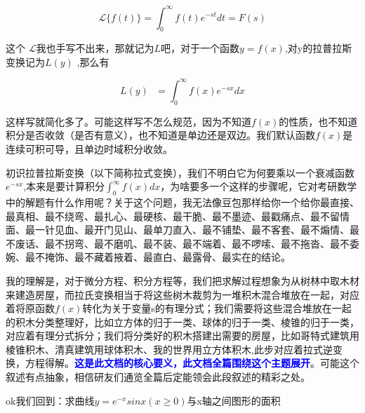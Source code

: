 \documentclass[12pt]{report}
\begin{document}
  \vspace{-15pt}
 
  \[
  \mathscr{L} \{ f(t) \} = \int_{0}^{\infty} f(t) e^{-st} dt = F(s)
  \]
  
   这个 $\mathscr{L}$我也手写不出来，那就记为$L$吧，对于一个函数$y=f(x)$,对y的拉普拉斯变换记为$L(y)$ ,那么有
   
     \vspace{-15pt}
   
   \[L\left(y\right)\:\:\:=\int_{0}^{\infty}f\left(x\right)e^{-sx}dx\]
   
   这样写就简化多了。可能这样写不怎么规范，因为不知道$f(x)$的性质，也不知道积分是否收敛（是否有意义），也不知道是单边还是双边。我们默认函数$f(x)$是连续可积可导，且单边时域积分收敛。
   
   初识拉普拉斯变换（以下简称拉式变换），我们不明白它为何要乘以一个衰减函数$e^{-sx}$,本来是要计算积分$\int_{0}^{\infty}f\left(x\right)dx$，为啥要多一个这样的步骤呢，它对考研数学中的解题有什么作用呢？关于这个问题，我无法像豆包那样给你一个给你最直接、最真相、最不绕弯、最扎心、最硬核、最干脆、最不墨迹、最戳痛点、最不留情面、最一针见血、最开门见山、最单刀直入、最不铺垫、最不客套、最不煽情、最不废话、最不拐弯、最不磨叽、最不装、最不端着、最不啰嗦、最不拖沓、最不委婉、最不掩饰、最不藏着掖着、最直白、最露骨、最实在的结论。
   
   我的理解是，对于微分方程、积分方程等，我们把求解过程想象为从树林中取木材来建造房屋，而拉氏变换相当于将这些树木裁剪为一堆积木混合堆放在一起，对应着将原函数$f(x)$转化为关于变量s的有理分式；我们需要将这些混合堆放在一起的积木分类整理好，比如立方体的归于一类、球体的归于一类、棱锥的归于一类，对应着有理分式拆分；我们将分类好的积木搭建出需要的房屋，比如哥特式建筑用棱锥积木、清真建筑用球体积木、我的世界用立方体积木,此步对应着拉式逆变换，方程得解。\textcolor{blue}{\textbf{这是此文档的核心要义，此文档全篇围绕这个主题展开}}。可能这个叙述有点抽象，相信研友们通览全篇后定能领会此段叙述的精彩之处。
   
   ok我们回到\hspace{0.5em}：求曲线$y=e^{-x}sinx\left(x\geqslant0\right)$与x轴之间图形的面积
   
\end{document}
